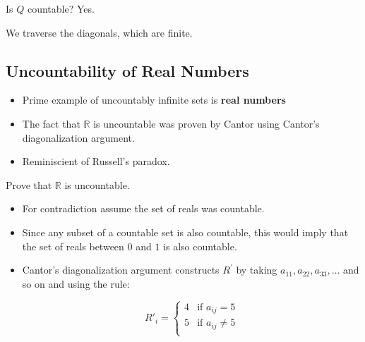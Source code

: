 \begin{example}
	Is $Q$ countable? Yes.

	We traverse the diagonals, which are finite.

	

\end{example}

\subsection{Uncountability of Real Numbers}

\begin{itemize}
	\item Prime example of uncountably infinite sets is \textbf{real numbers}
	\item The fact that $\mathbb{R}$ is uncountable was proven by Cantor using Cantor's diagonalization argument.
	\item Reminiscient of Russell's paradox.
\end{itemize}

\begin{example}
	Prove that $\mathbb{R}$ is uncountable.

	\begin{itemize}
		\item For contradiction assume the set of reals was countable.
		\item Since any subset of a countable set is also countable, this would
		      imply that the set of reals between $0$ and $1$ is also countable.
		\item Cantor's diagonalization argument constructs $R^\prime$ by taking
		      $a_11, a_22, a_33, \ldots$ and so on and using the rule:

		      \[
			      R'_i = \begin{cases}
				      4 & \text{if } a_{ij} = 5    \\
				      5 & \text{if } a_{ij} \neq 5 \\
			      \end{cases}
		      \]
	\end{itemize}
\end{example}